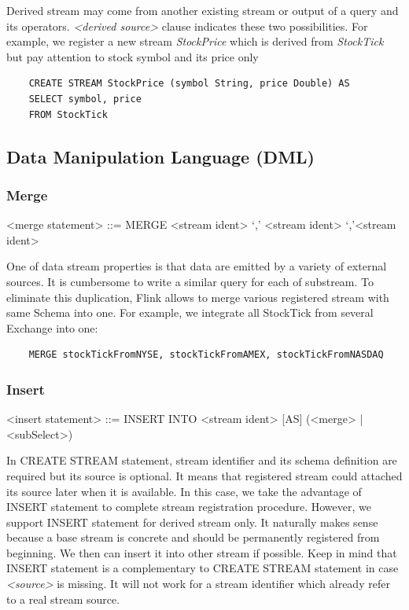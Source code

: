 Derived stream may come from another existing stream or output of a query and its operators. \textit{<derived source>} clause indicates these two possibilities. For example, we register a new stream \textit{StockPrice} which is derived from \textit{StockTick} but pay attention to stock symbol and its price only
\begin{lstlisting}
	CREATE STREAM StockPrice (symbol String, price Double) AS
	SELECT symbol, price 
	FROM StockTick
\end{lstlisting}


\subsection{Data Manipulation Language (DML)}



\subsubsection{Merge}
\begin{grammar}
<merge statement> ::= MERGE <stream ident> `,' <stream ident> {`,'<stream ident>}
\end{grammar}

One of data stream properties is that data are emitted by a variety of external sources. It is cumbersome to write a similar query for each of substream. To eliminate this duplication, Flink allows to merge various registered stream with same Schema into one. For example, we integrate all StockTick from several Exchange into one:
\begin{verbatim}
	MERGE stockTickFromNYSE, stockTickFromAMEX, stockTickFromNASDAQ
\end{verbatim}

\subsubsection{Insert}

\begin{grammar}
<insert statement> ::= INSERT INTO <stream ident> [AS] 
							(<merge> | <subSelect>)
\end{grammar}

In CREATE STREAM statement, stream identifier and its schema definition are required but its source is optional. It means that registered stream could attached its source later when it is available. In this case, we take the advantage of INSERT statement to complete stream registration procedure. However, we support INSERT statement for derived stream only. It naturally makes sense because a base stream is concrete and should be permanently registered from beginning. We then can insert it into other stream if possible.
Keep in mind that INSERT statement is a complementary to CREATE STREAM statement in case \textit{<source>} is missing. It will not work for a stream identifier which already refer to a real stream source.


